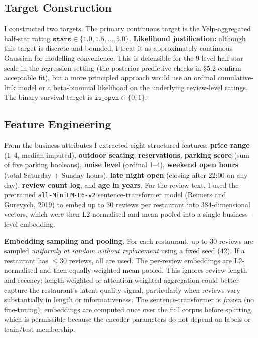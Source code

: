 \documentclass[10pt, letterpaper]{article}
\begin{document}
\subsection{Target Construction}

I constructed two targets. The primary continuous target is the Yelp-aggregated half-star rating $\texttt{stars} \in \{1.0, 1.5, \ldots, 5.0\}$. \textbf{Likelihood justification:} although this target is discrete and bounded, I treat it as approximately continuous Gaussian for modelling convenience. This is defensible for the 9-level half-star scale in the regression setting (the posterior predictive checks in \S5.2 confirm acceptable fit), but a more principled approach would use an ordinal cumulative-link model or a beta-binomial likelihood on the underlying review-level ratings. The binary survival target is $\texttt{is\_open} \in \{0, 1\}$.

\subsection{Feature Engineering}

From the business attributes I extracted eight structured features: \textbf{price range} (1--4, median-imputed), \textbf{outdoor seating}, \textbf{reservations}, \textbf{parking score} (sum of five parking booleans), \textbf{noise level} (ordinal 1--4), \textbf{weekend open hours} (total Saturday + Sunday hours), \textbf{late night open} (closing after 22:00 on any day), \textbf{review count log}, and \textbf{age in years}. For the review text, I used the pretrained \texttt{all-MiniLM-L6-v2} sentence-transformer model (Reimers and Gurevych, 2019) to embed up to 30 reviews per restaurant into 384-dimensional vectors, which were then L2-normalised and mean-pooled into a single business-level embedding.

\textbf{Embedding sampling and pooling.} For each restaurant, up to 30 reviews are sampled \emph{uniformly at random without replacement} using a fixed seed (42). If a restaurant has $\leq 30$ reviews, all are used. The per-review embeddings are L2-normalised and then equally-weighted mean-pooled. This ignores review length and recency; length-weighted or attention-weighted aggregation could better capture the restaurant's latent quality signal, particularly when reviews vary substantially in length or informativeness. The sentence-transformer is \emph{frozen} (no fine-tuning); embeddings are computed once over the full corpus before splitting, which is permissible because the encoder parameters do not depend on labels or train/test membership.
\end{document}
